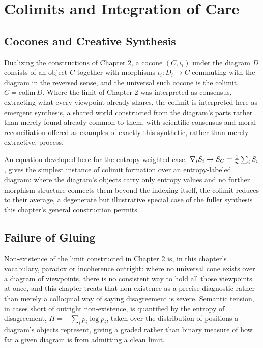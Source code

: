 \part{Colimits and Integration of Care}

\chapter{Cocones and Creative Synthesis}

Dualizing the constructions of Chapter 2, a cocone $(C, \iota_i)$ under the diagram $D$ consists of an object $C$ together with morphisms $\iota_i: D_i \to C$ commuting with the diagram in the reversed sense, and the universal such cocone is the colimit, $C = \mathrm{colim}\, D$. Where the limit of Chapter 2 was interpreted as consensus, extracting what every viewpoint already shares, the colimit is interpreted here as emergent synthesis, a shared world constructed from the diagram's parts rather than merely found already common to them, with scientific consensus and moral reconciliation offered as examples of exactly this synthetic, rather than merely extractive, process.

An equation developed here for the entropy-weighted case, $\nabla_i S_i \to S_C = \frac{1}{n}\sum_i S_i$, gives the simplest instance of colimit formation over an entropy-labeled diagram: where the diagram's objects carry only entropy values and no further morphism structure connects them beyond the indexing itself, the colimit reduces to their average, a degenerate but illustrative special case of the fuller synthesis this chapter's general construction permits.

\chapter{Failure of Gluing}

Non-existence of the limit constructed in Chapter 2 is, in this chapter's vocabulary, paradox or incoherence outright: where no universal cone exists over a diagram of viewpoints, there is no consistent way to hold all those viewpoints at once, and this chapter treats that non-existence as a precise diagnostic rather than merely a colloquial way of saying disagreement is severe. Semantic tension, in cases short of outright non-existence, is quantified by the entropy of disagreement, $H = -\sum_i p_i \log p_i$, taken over the distribution of positions a diagram's objects represent, giving a graded rather than binary measure of how far a given diagram is from admitting a clean limit.

